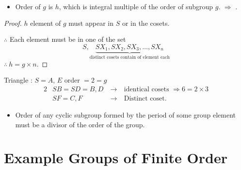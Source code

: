 \begin{itemize}
\item Order of $g$ is $h$, which is integral multiple of the order of subgroup $g$. $\Rightarrow$ .
\end{itemize}

\begin{proof}
$h$ element of $g$ must appear in $S$ or in the cosets.

$\therefore$ Each element must be in one of the set
$$
S, \underbrace{SX_{1},SX_{2},SX_{3},\ldots,SX_{n}}_{\text{distinct cosets contain of element each}}
$$
$\therefore \ h=g\times n$.
\end{proof}

\begin{example*}
Triangle : $S=A$, $E$ order $=2=g$
\begin{alignat*}{2}
& SB = SD=B,D &~ \to~ & \text{identical cosets } \Rightarrow 6=2\times 3\\
& SF= C,F &~\to~ & \text{Distinct coset}.
\end{alignat*}
\end{example*}
\begin{itemize}
\item Order of any cyclic subgroup formed by the period of some group element must be a divisor of the order of the group.
\end{itemize}

\section*{Example Groups of Finite Order}

